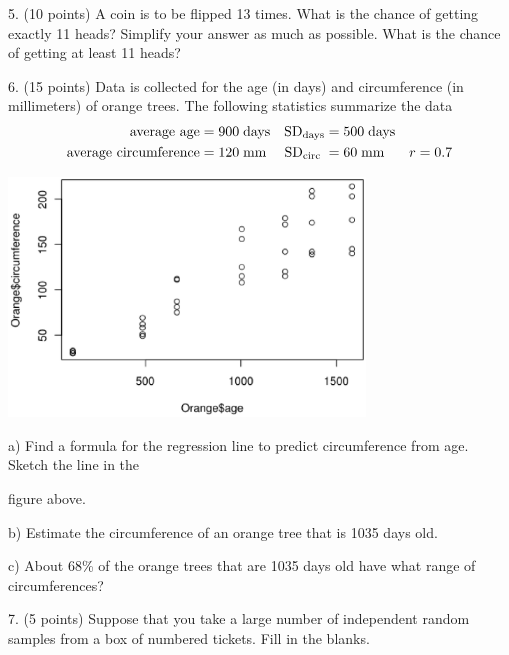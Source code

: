 \documentclass[10pt]{article}
\newcommand{\HH}{\hspace{10pt}\hphantom{a) } }
\begin{document}
5. (10 points) A coin is to be flipped 13 times. What is the chance of 
getting exactly 11 heads?  Simplify your answer as much as possible.
What is the chance of getting at least 11 heads?
\vfill
\eject
{\ }

6. (15 points) Data is collected for the age (in days) and circumference (in millimeters) 
of orange trees.
The following statistics summarize the data
\begin{align*}
\mbox{average age}&= 900\;\mbox{days} & \mbox{SD}_{\scriptsize\mbox{days}} &= 500\;\mbox{days}\\
\mbox{average circumference} &= 120\;\mbox{mm} & \mbox{SD}_{\scriptsize\mbox{circ}}\; &= 60\;\mbox{mm}
   & r=0.7
\end{align*}

\begin{center}
\includegraphics[height=2.5in,bb= 0 0 515 335, clip]{Oranges.eps}
\end{center}

\hspace{10pt} a) Find a formula for the regression line to predict circumference 
from age.  Sketch the line in the\vspace{-4pt}

\HH  figure above.
\vspace{1.5in}

\hspace{10pt} b) Estimate the circumference of an orange tree that is
1035 days old.
\vspace{2in}

\hspace{10pt} c) About 68\% of the orange trees that are 1035 days old 
have what range of circumferences?
\vfill
\eject
{\ }

7. (5 points)
Suppose that you take a large number of independent random samples from a box of numbered
tickets.
Fill in the blanks.
\end{document}
